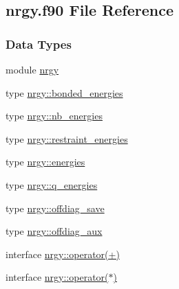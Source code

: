 \hypertarget{nrgy_8f90}{\subsection{nrgy.\-f90 File Reference}
\label{nrgy_8f90}
}
\subsubsection*{Data Types}
\begin{DoxyCompactItemize}
\item 
module \hyperlink{classnrgy}{nrgy}
\item 
type \hyperlink{structnrgy_1_1bonded__energies}{nrgy\-::bonded\-\_\-energies}
\item 
type \hyperlink{structnrgy_1_1nb__energies}{nrgy\-::nb\-\_\-energies}
\item 
type \hyperlink{structnrgy_1_1restraint__energies}{nrgy\-::restraint\-\_\-energies}
\item 
type \hyperlink{structnrgy_1_1energies}{nrgy\-::energies}
\item 
type \hyperlink{structnrgy_1_1q__energies}{nrgy\-::q\-\_\-energies}
\item 
type \hyperlink{structnrgy_1_1offdiag__save}{nrgy\-::offdiag\-\_\-save}
\item 
type \hyperlink{structnrgy_1_1offdiag__aux}{nrgy\-::offdiag\-\_\-aux}
\item 
interface \hyperlink{interfacenrgy_1_1operator_07_09_08}{nrgy\-::operator(+)}
\item 
interface \hyperlink{interfacenrgy_1_1operator_07_5_08}{nrgy\-::operator($\ast$)}
\end{DoxyCompactItemize}

